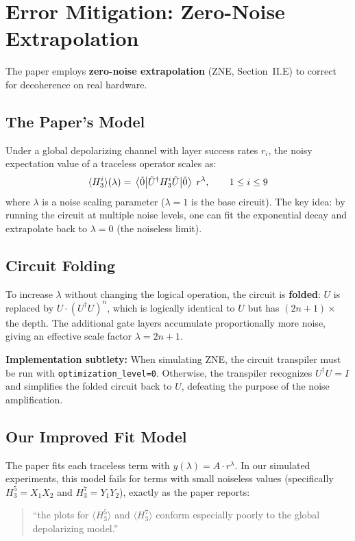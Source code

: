 \documentclass[11pt,a4paper]{article}
\begin{document}
\section{Error Mitigation: Zero-Noise Extrapolation}

The paper employs \textbf{zero-noise extrapolation} (ZNE, Section~II.E) to correct for decoherence on real hardware.

\subsection{The Paper's Model}

Under a global depolarizing channel with layer success rates $r_i$, the noisy expectation value of a traceless operator scales as:
\begin{equation}
  \langle H_3^i \rangle(\lambda) = \mel{\tilde{0}}{\tilde{U}^\dagger H_3^i \tilde{U}}{\tilde{0}}\; r^\lambda, \qquad 1 \leq i \leq 9
  \label{eq:zne_model}
\end{equation}
where $\lambda$ is a noise scaling parameter ($\lambda=1$ is the base circuit). The key idea: by running the circuit at multiple noise levels, one can fit the exponential decay and extrapolate back to $\lambda=0$ (the noiseless limit).

\subsection{Circuit Folding}

To increase $\lambda$ without changing the logical operation, the circuit is \textbf{folded}: $U$ is replaced by $U \cdot (U^\dagger U)^n$, which is logically identical to $U$ but has $(2n+1)\times$ the depth. The additional gate layers accumulate proportionally more noise, giving an effective scale factor $\lambda = 2n+1$.

\textbf{Implementation subtlety:} When simulating ZNE, the circuit transpiler must be run with \texttt{optimization\_level=0}. Otherwise, the transpiler recognizes $U^\dagger U = I$ and simplifies the folded circuit back to $U$, defeating the purpose of the noise amplification.

\subsection{Our Improved Fit Model}

The paper fits each traceless term with $y(\lambda) = A \cdot r^\lambda$. In our simulated experiments, this model fails for terms with small noiseless values (specifically $H_3^5 = X_1 X_2$ and $H_3^7 = Y_1 Y_2$), exactly as the paper reports:
\begin{quote}
``the plots for $\langle H_3^5 \rangle$ and $\langle H_3^7 \rangle$ conform especially poorly to the global depolarizing model.''
\end{quote}
\end{document}
